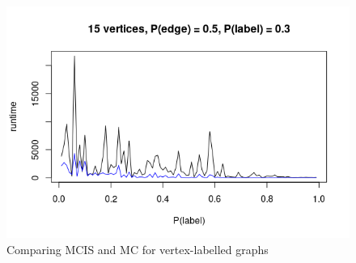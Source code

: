 \documentclass{article}
\theoremstyle{definition}
\begin{document}
\begin{figure}
  \includegraphics[scale=0.5]{conversion2.png}
  \caption{Comparing MCIS and MC for vertex-labelled graphs}
  \label{fig:conversion2}
\end{figure}
\end{document}
